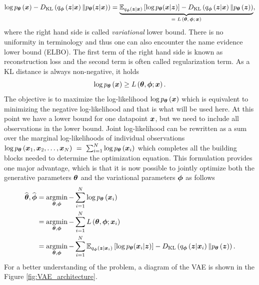 \begin{equation}
\log p_{\boldsymbol{\theta}}\left(\boldsymbol{x}\right) - D_{\mathrm{KL}}\left(q_{\boldsymbol{\phi}}\left(\boldsymbol{z}\vert \boldsymbol{x} \right) \Vert p_{\boldsymbol{\theta}}(\boldsymbol{z}\vert \boldsymbol{x})\right) = \underbrace{\mathbb{E}_{q_{\boldsymbol{\phi}}\left(\boldsymbol{z}\vert \boldsymbol{x} \right)}\left[\log p_{\boldsymbol{\theta}}(\boldsymbol{x}\vert \boldsymbol{z}) \right] - D_{\mathrm{KL}}\left(q_{\boldsymbol{\phi}}\left(\boldsymbol{z}\vert\boldsymbol{x} \right) \Vert p_{\boldsymbol{\theta}}\left(\boldsymbol{z}\right)\right)}_{\text{= $L\left(\boldsymbol{\theta},\boldsymbol{\phi}; \boldsymbol{x}\right)$}},
\end{equation}
where the right hand side is called \emph{variational} lower bound. There is no uniformity in terminology and thus one can also encounter the name evidence lower bound (ELBO). The first term of the right hand side is known as reconstruction loss and the second term is often called regularization term. As a KL distance is always non-negative, it holds
\begin{equation}
    \log p_{\boldsymbol{\theta}}\left(\boldsymbol{x}\right) \geq L\left(\boldsymbol{\theta},\boldsymbol{\phi}; \boldsymbol{x}\right).
\end{equation}
The objective is to maximize the log-likelihood $\log p_{\boldsymbol{\theta}}\left(\boldsymbol{x}\right)$ which is equivalent to minimizing the negative log-likelihood and that is what will be used here. At this point we have a lower bound for one datapoint $\boldsymbol{x}$, but we need to include all observations in the lower bound. Joint log-likelihood can be rewritten as a sum over the marginal log-likelihoods of individual observations $\log p_{\boldsymbol{\theta}}\left(\boldsymbol{x}_1,\boldsymbol{x}_2,\dots,\boldsymbol{x}_N\right)~=~\sum_{i=1}^N\log p_{\boldsymbol{\theta}}\left(\boldsymbol{x}_i\right)$ which completes all the building blocks needed to determine the optimization equation. This formulation provides one major advantage, which is that it is now possible to jointly optimize both the generative parameters $\boldsymbol{\theta}$ and the variational parameters $\boldsymbol{\phi}$ as follows 
\begin{align}
   \widehat{\boldsymbol{\theta}}, \widehat{\boldsymbol{\phi}} &= \mathop{\mathrm{argmin}}_{\boldsymbol{\theta},\boldsymbol{\phi}}-\sum_{i=1}^N\log p_{\boldsymbol{\theta}}\left(\boldsymbol{x}_i\right)\\
   &=\mathop{\mathrm{argmin}}_{\boldsymbol{\theta},\boldsymbol{\phi}}-\sum_{i=1}^N L\left(\boldsymbol{\theta},\boldsymbol{\phi}; \boldsymbol{x}_i\right)\\
  &= \mathop{\mathrm{argmin}}_{\boldsymbol{\theta},\boldsymbol{\phi}}-\sum_{i=1}^N\mathbb{E}_{q_{\boldsymbol{\phi}}\left(\boldsymbol{z}\vert \boldsymbol{x}_i \right)}\left[\log p_{\boldsymbol{\theta}}(\boldsymbol{x}_i\vert \boldsymbol{z}) \right] - D_{\mathrm{KL}}\left(q_{\boldsymbol{\phi}}\left(\boldsymbol{z}\vert\boldsymbol{x}_i \right) \Vert p_{\boldsymbol{\theta}}\left(\boldsymbol{z}\right)\right).\label{eq:VAEloss}
\end{align}
For a better understanding of the problem, a diagram of the VAE is shown in the Figure \ref{fig:VAE_architecture}.
